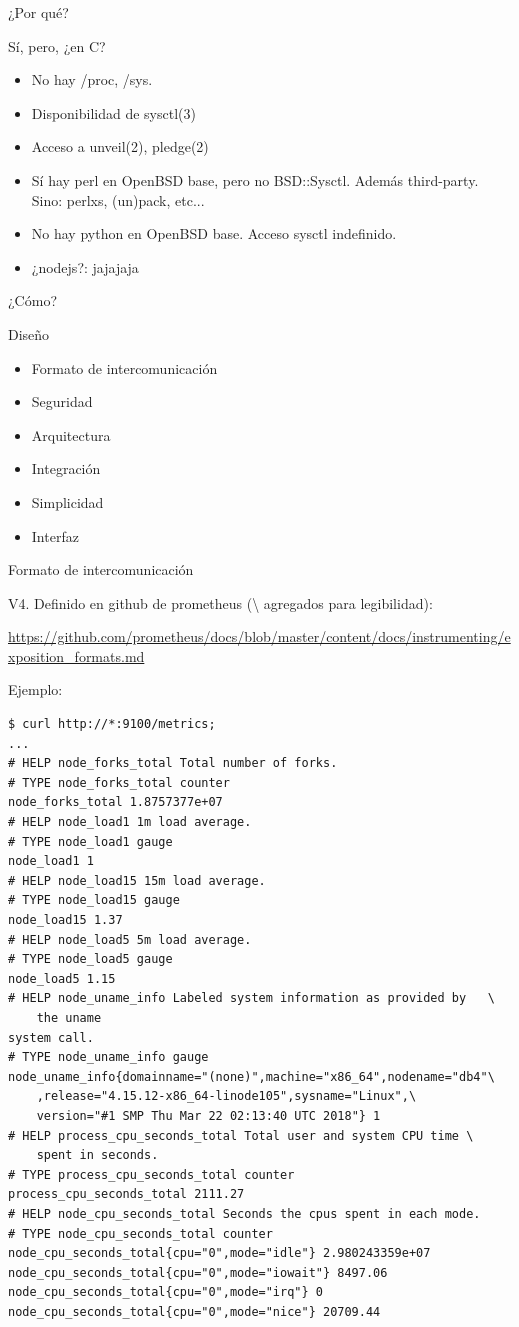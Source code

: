 \documentclass[11pt,spanish]{article}
\newcommand{\rowsp}[1][1em]{\vspace{#1}}
\newcommand{\hone}[1]{{\rowsp[0.3em]\noindent\Large #1 \rowsp[0.3em]}}
\newcommand{\htwo}[1]{{\rowsp\noindent\large #1 \rowsp}}
\newcommand{\myitm}[1]{\begin{itemize}#1\end{itemize}}
\begin{document}
\newpage %
\hone{¿Por qué?}

Sí, pero, ¿en C?
\myitm{
\item No hay /proc, /sys.
\item Disponibilidad de sysctl(3)
\item Acceso a unveil(2), pledge(2)
\item Sí hay perl en OpenBSD base, pero no BSD::Sysctl.
	Además third-party. Sino: perlxs, (un)pack, etc...
\item No hay python en OpenBSD base. Acceso sysctl indefinido.
\item ¿nodejs?: jajajaja
}

\newpage %
\hone{¿Cómo?}

\htwo{Diseño}

\myitm{
\item Formato de intercomunicación
\item Seguridad
\item Arquitectura
\item Integración
\item Simplicidad
\item Interfaz
}

\newpage %
\hone{Formato de intercomunicación}

V4. Definido en github de prometheus (\textbackslash{} agregados para legibilidad):

\href{https://github.com/prometheus/docs/blob/master/content/docs/instrumenting/exposition_formats.md}{\tiny https://github.com/prometheus/docs/blob/master/content/docs/instrumenting/exposition\_formats.md}

Ejemplo:
\begin{lstlisting}
$ curl http://*:9100/metrics;
...
# HELP node_forks_total Total number of forks.
# TYPE node_forks_total counter
node_forks_total 1.8757377e+07
# HELP node_load1 1m load average.
# TYPE node_load1 gauge
node_load1 1
# HELP node_load15 15m load average.
# TYPE node_load15 gauge
node_load15 1.37
# HELP node_load5 5m load average.
# TYPE node_load5 gauge
node_load5 1.15
# HELP node_uname_info Labeled system information as provided by   \
	the uname
system call.
# TYPE node_uname_info gauge
node_uname_info{domainname="(none)",machine="x86_64",nodename="db4"\
    ,release="4.15.12-x86_64-linode105",sysname="Linux",\
    version="#1 SMP Thu Mar 22 02:13:40 UTC 2018"} 1
# HELP process_cpu_seconds_total Total user and system CPU time \
    spent in seconds.
# TYPE process_cpu_seconds_total counter
process_cpu_seconds_total 2111.27
# HELP node_cpu_seconds_total Seconds the cpus spent in each mode.
# TYPE node_cpu_seconds_total counter
node_cpu_seconds_total{cpu="0",mode="idle"} 2.980243359e+07
node_cpu_seconds_total{cpu="0",mode="iowait"} 8497.06
node_cpu_seconds_total{cpu="0",mode="irq"} 0
node_cpu_seconds_total{cpu="0",mode="nice"} 20709.44
\end{lstlisting}
\end{document}
